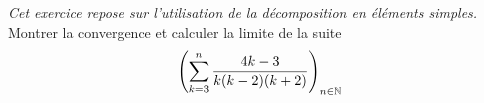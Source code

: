 \emph{Cet exercice repose sur l'utilisation de la d{\'e}composition en
{\'e}l{\'e}ments simples.}\newline
Montrer la convergence et calculer la limite de la suite
\[
\left( \sum_{k=3}^{n}\frac{4k-3}{k(k-2)(k+2)}\right) _{n\in
\mathbb{N}}
\] 